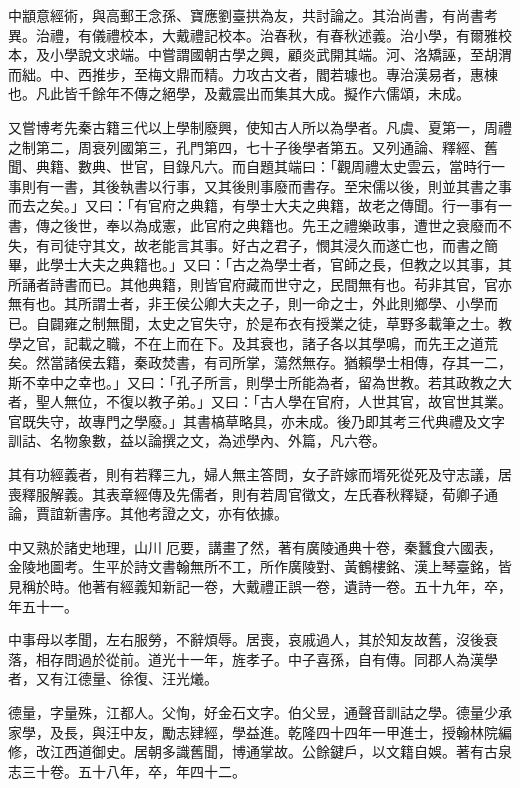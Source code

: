 \begin{pinyinscope}
中顓意經術，與高郵王念孫、寶應劉臺拱為友，共討論之。其治尚書，有尚書考異。治禮，有儀禮校本，大戴禮記校本。治春秋，有春秋述義。治小學，有爾雅校本，及小學說文求端。中嘗謂國朝古學之興，顧炎武開其端。河、洛矯誣，至胡渭而絀。中、西推步，至梅文鼎而精。力攻古文者，閻若璩也。專治漢易者，惠棟也。凡此皆千餘年不傳之絕學，及戴震出而集其大成。擬作六儒頌，未成。

又嘗博考先秦古籍三代以上學制廢興，使知古人所以為學者。凡虞、夏第一，周禮之制第二，周衰列國第三，孔門第四，七十子後學者第五。又列通論、釋經、舊聞、典籍、數典、世官，目錄凡六。而自題其端曰：「觀周禮太史雲云，當時行一事則有一書，其後執書以行事，又其後則事廢而書存。至宋儒以後，則並其書之事而去之矣。」又曰：「有官府之典籍，有學士大夫之典籍，故老之傳聞。行一事有一書，傳之後世，奉以為成憲，此官府之典籍也。先王之禮樂政事，遭世之衰廢而不失，有司徒守其文，故老能言其事。好古之君子，憫其浸久而遂亡也，而書之簡畢，此學士大夫之典籍也。」又曰：「古之為學士者，官師之長，但教之以其事，其所誦者詩書而已。其他典籍，則皆官府藏而世守之，民間無有也。茍非其官，官亦無有也。其所謂士者，非王侯公卿大夫之子，則一命之士，外此則鄉學、小學而已。自闢雍之制無聞，太史之官失守，於是布衣有授業之徒，草野多載筆之士。教學之官，記載之職，不在上而在下。及其衰也，諸子各以其學鳴，而先王之道荒矣。然當諸侯去籍，秦政焚書，有司所掌，蕩然無存。猶賴學士相傳，存其一二，斯不幸中之幸也。」又曰：「孔子所言，則學士所能為者，留為世教。若其政教之大者，聖人無位，不復以教子弟。」又曰：「古人學在官府，人世其官，故官世其業。官既失守，故專門之學廢。」其書槁草略具，亦未成。後乃即其考三代典禮及文字訓詁、名物象數，益以論撰之文，為述學內、外篇，凡六卷。

其有功經義者，則有若釋三九，婦人無主答問，女子許嫁而壻死從死及守志議，居喪釋服解義。其表章經傳及先儒者，則有若周官徵文，左氏春秋釋疑，荀卿子通論，賈誼新書序。其他考證之文，亦有依據。

中又熟於諸史地理，山川厄要，講畫了然，著有廣陵通典十卷，秦蠶食六國表，金陵地圖考。生平於詩文書翰無所不工，所作廣陵對、黃鶴樓銘、漢上琴臺銘，皆見稱於時。他著有經義知新記一卷，大戴禮正誤一卷，遺詩一卷。五十九年，卒，年五十一。

中事母以孝聞，左右服勞，不辭煩辱。居喪，哀戚過人，其於知友故舊，沒後衰落，相存問過於從前。道光十一年，旌孝子。中子喜孫，自有傳。同郡人為漢學者，又有江德量、徐復、汪光爔。

德量，字量殊，江都人。父恂，好金石文字。伯父昱，通聲音訓詁之學。德量少承家學，及長，與汪中友，勵志肄經，學益進。乾隆四十四年一甲進士，授翰林院編修，改江西道御史。居朝多識舊聞，博通掌故。公餘鍵戶，以文籍自娛。著有古泉志三十卷。五十八年，卒，年四十二。


\end{pinyinscope}
